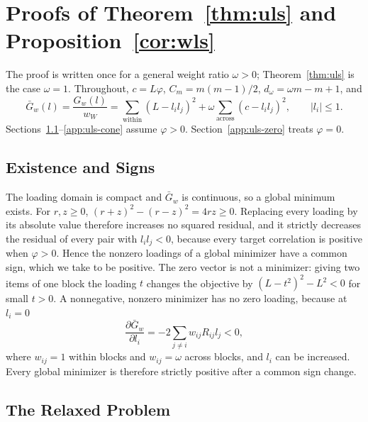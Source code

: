 \section{Proofs of Theorem~\ref{thm:uls} and Proposition~\ref{cor:wls}}
\label{app:uls}

The proof is written once for a general weight ratio $\omega>0$; Theorem~\ref{thm:uls} is the case $\omega=1$. Throughout, $c=L\varphi$, $C_m=m(m-1)/2$, $d_\omega=\omega m-m+1$, and
\[
\bar G_w(l)=\frac{G_w(l)}{w_W}
=\sum_{\mathrm{within}}(L-l_il_j)^2+\omega\sum_{\mathrm{across}}(c-l_il_j)^2,
\qquad |l_i|\le1 .
\]
Sections~\ref{app:uls-signs}--\ref{app:uls-cone} assume $\varphi>0$. Section~\ref{app:uls-zero} treats $\varphi=0$.

\subsection{Existence and Signs}
\label{app:uls-signs}

The loading domain is compact and $\bar G_w$ is continuous, so a global minimum exists. For $r,z\ge0$, $(r+z)^2-(r-z)^2=4rz\ge0$. Replacing every loading by its absolute value therefore increases no squared residual, and it strictly decreases the residual of every pair with $l_il_j<0$, because every target correlation is positive when $\varphi>0$. Hence the nonzero loadings of a global minimizer have a common sign, which we take to be positive. The zero vector is not a minimizer: giving two items of one block the loading $t$ changes the objective by $(L-t^2)^2-L^2<0$ for small $t>0$. A nonnegative, nonzero minimizer has no zero loading, because at $l_i=0$
\[
\frac{\partial\bar G_w}{\partial l_i}=-2\sum_{j\ne i}w_{ij}R_{ij}l_j<0,
\]
where $w_{ij}=1$ within blocks and $w_{ij}=\omega$ across blocks, and $l_i$ can be increased. Every global minimizer is therefore strictly positive after a common sign change.

\subsection{The Relaxed Problem}
\label{app:uls-relaxed}

